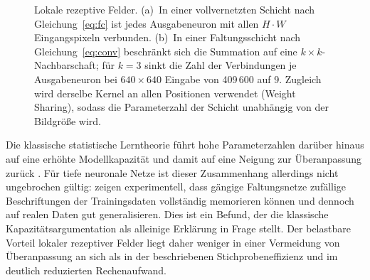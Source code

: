 \begin{figure}[htbp]
\centering
{}
\caption[Vollvernetzte Schicht gegen Faltungsschicht]{Lokale rezeptive Felder.
(a)~In einer vollvernetzten Schicht nach Gleichung~\eqref{eq:fc} ist jedes
Ausgabeneuron mit allen $H\cdot W$ Eingangspixeln verbunden. (b)~In einer
Faltungsschicht nach Gleichung~\eqref{eq:conv} beschränkt sich die Summation auf
eine $k\times k$-Nachbarschaft; für $k=3$ sinkt die Zahl der Verbindungen je
Ausgabeneuron bei $640\times640$ Eingabe von 409\,600 auf 9. Zugleich wird
derselbe Kernel an allen Positionen verwendet (Weight Sharing), sodass die
Parameterzahl der Schicht unabhängig von der Bildgröße wird.}
\label{abb:rezeptivesfeld}
\end{figure}

Die klassische statistische Lerntheorie führt hohe Parameterzahlen darüber
hinaus auf eine erhöhte Modellkapazität und damit auf eine Neigung zur
Überanpassung zurück \parencite[Kap.~5]{goodfellow2016}. Für tiefe neuronale
Netze ist dieser Zusammenhang allerdings nicht ungebrochen gültig:
\textcite{zhang2017rethinking} zeigen experimentell, dass gängige Faltungsnetze
zufällige Beschriftungen der Trainingsdaten vollständig memorieren können und
dennoch auf realen Daten gut generalisieren. Dies ist ein Befund, der die klassische
Kapazitätsargumentation als alleinige Erklärung in Frage stellt. Der belastbare
Vorteil lokaler rezeptiver Felder liegt daher weniger in einer Vermeidung von
Überanpassung an sich als in der beschriebenen Stichprobeneffizienz und im
deutlich reduzierten Rechenaufwand.

